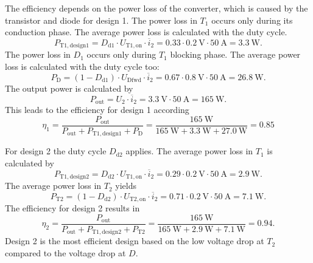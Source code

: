 \begin{solutionblock}
	The efficiency depends on the power loss of the converter, which is caused by the transistor and diode for design 1.
	The power loss in $T_\mathrm{1}$ occurs only during its conduction phase. The average power loss is calculated with the duty cycle.
	\begin{equation*}
		P_\mathrm{T1,design1} = D_\mathrm{d1} \cdot U_\mathrm{T1,on} \cdot \overline{i}_\mathrm{2}
		= 0.33 \cdot \SI{0.2}{\volt}  \cdot \SI{50}{\ampere} = \SI{3.3}{\watt}.
	\end{equation*}
	The power loss in $D_\mathrm{1}$ occurs only during $T_\mathrm{1}$ blocking phase. The average power loss is calculated with the duty cycle too:
	\begin{equation*}
		P_\mathrm{D} = (1-D_\mathrm{d1}) \cdot U_\mathrm{Dfwd} \cdot \overline{i}_\mathrm{2}
		= 0.67 \cdot \SI{0.8}{\volt}  \cdot \SI{50}{\ampere} = \SI{26.8}{\watt}.
	\end{equation*}
	The output power is calculated by
	\begin{equation*}
		P_\mathrm{out} = U_\mathrm{2} \cdot \overline{i}_\mathrm{2} = \SI{3.3}{\volt}  \cdot \SI{50}{\ampere} = \SI{165}{\watt}.
	\end{equation*}
	This leads to the efficiency for design 1 according
	\begin{equation*}
		\eta_\mathrm{1}=\frac{P_\mathrm{out}}{P_\mathrm{out}+P_\mathrm{T1,design1}+P_\mathrm{D}}
		=\frac{\SI{165}{\watt}}{\SI{165}{\watt}+\SI{3.3}{\watt}+\SI{27.0}{\watt}} = 0.85
	\end{equation*}

	For design 2 the duty cycle $D_\mathrm{d2}$ applies. The average power loss in $T_\mathrm{1}$ is calculated by
	\begin{equation*}
		P_\mathrm{T1,design2} = D_\mathrm{d2} \cdot U_\mathrm{T1,on} \cdot \overline{i}_\mathrm{2}
		= 0.29 \cdot \SI{0.2}{\volt}  \cdot \SI{50}{\ampere} = \SI{2.9}{\watt}.
	\end{equation*}
	The average  power loss in $T_\mathrm{2}$ yields
	\begin{equation*}
		P_\mathrm{T2} = (1-D_\mathrm{d2}) \cdot U_\mathrm{T2,on}  \cdot \overline{i}_\mathrm{2}
		= 0.71 \cdot \SI{0.2}{\volt}  \cdot \SI{50}{\ampere} = \SI{7.1}{\watt}.
	\end{equation*}
	The efficiency for design 2 results in
	\begin{equation*}
		\eta_\mathrm{2}=\frac{P_\mathrm{out}}{P_\mathrm{out}+P_\mathrm{T1,design2}+P_\mathrm{T2}}
		=\frac{\SI{165}{\watt}}{\SI{165}{\watt}+\SI{2.9}{\watt}+\SI{7.1}{\watt}} = 0.94.
	\end{equation*}
	Design 2 is the most efficient design based on the low voltage drop at $T_\mathrm{2}$ compared to the voltage drop at $D$.

\end{solutionblock}

